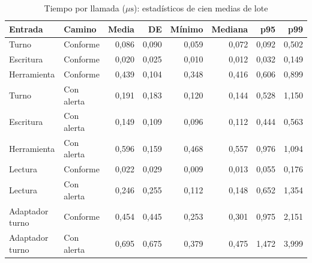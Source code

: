 \begin{table}[!t]
\caption{Tiempo por llamada ($\mu\mathrm{s}$): estadísticos de cien medias de lote}
\label{tab:times}
\centering\footnotesize
\setlength{\tabcolsep}{3pt}
\begin{tabular*}{\textwidth}{@{\extracolsep{\fill}}llrrrrrr}
\hline
Entrada & Camino & Media & DE & Mínimo & Mediana & p95 & p99\\
\hline
Turno & Conforme & 0,086 & 0,090 & 0,059 & 0,072 & 0,092 & 0,502\\
Escritura & Conforme & 0,020 & 0,025 & 0,010 & 0,012 & 0,032 & 0,149\\
Herramienta & Conforme & 0,439 & 0,104 & 0,348 & 0,416 & 0,606 & 0,899\\
Turno & Con alerta & 0,191 & 0,183 & 0,120 & 0,144 & 0,528 & 1,150\\
Escritura & Con alerta & 0,149 & 0,109 & 0,096 & 0,112 & 0,444 & 0,563\\
Herramienta & Con alerta & 0,596 & 0,159 & 0,468 & 0,557 & 0,976 & 1,094\\
Lectura & Conforme & 0,022 & 0,029 & 0,009 & 0,013 & 0,055 & 0,176\\
Lectura & Con alerta & 0,246 & 0,255 & 0,112 & 0,148 & 0,652 & 1,354\\
Adaptador turno & Conforme & 0,454 & 0,445 & 0,253 & 0,301 & 0,975 & 2,151\\
Adaptador turno & Con alerta & 0,695 & 0,675 & 0,379 & 0,475 & 1,472 & 3,999\\
\hline\end{tabular*}\end{table}
